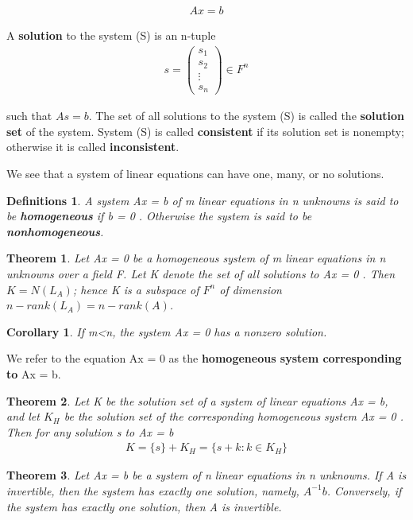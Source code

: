 \documentclass{article}
\newcommand{\bd}[1]{\textbf{#1}}
\newcommand*\bpmat[0]{\begin{pmatrix}}
\newcommand*\epmat[0]{\end{pmatrix}}
\theoremstyle{plain}
\newtheorem{theorem}{Theorem}[section]
\newtheorem*{corollary}{Corollary}
\newtheorem*{definitions}{Definitions}
\theoremstyle{plain} %
\begin{document}
\begin{align*}
  Ax=b
\end{align*}

A \bd{solution} to the system (S) is an n-tuple
\begin{align*}
  s=\bpmat s_1\\s_2\\\vdots\\s_n\epmat \in F^n
\end{align*}

such that $As = b$. The set of all solutions to the system (S) is called the \bd{solution set} of the system. System (S) is called \bd{consistent} if its solution set is nonempty; otherwise it is called \bd{inconsistent}.

We see that a system of linear equations can have one, many, or no solutions.

\begin{definitions}
  A system Ax = b of m linear equations in n unknowns is said to be \bd{homogeneous} if b = 0 . Otherwise the system is said to be \bd{nonhomogeneous}.
\end{definitions}

\begin{theorem}
  Let Ax = 0 be a homogeneous system of m linear equations in n unknowns over a field F. Let K denote the set of all solutions to Ax = 0 . Then $K = N(L_A)$; hence K is a subspace of $F^n$ of dimension $n − rank(L_A) = n − rank(A)$.
\end{theorem}

\begin{corollary}
  If m<n, the system Ax = 0 has a nonzero solution.
\end{corollary}

We refer to the equation Ax = 0 as the \bd{homogeneous system corresponding to} Ax = b.

\begin{theorem}
  Let K be the solution set of a system of linear equations Ax = b, and let $K_H$ be the solution set of the corresponding homogeneous system Ax = 0 . Then for any solution s to Ax = b
  \begin{align*}
    K = \{s\} + K_H = \{s + k : k \in K_H\}
  \end{align*}
\end{theorem}

\begin{theorem}
  Let Ax = b be a system of n linear equations in n unknowns. If A is invertible, then the system has exactly one solution, namely, $A^{-1}b$. Conversely, if the system has exactly one solution, then A is invertible.
\end{theorem}
\end{document}
